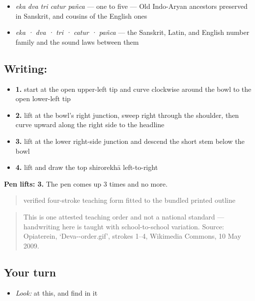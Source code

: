 \begin{itemize}
\raggedright
  \item \emph{eka dva tri catur pañca} — one to five — Old Indo-Aryan ancestors preserved in Sanskrit, and cousins of the English ones
  \item \emph{eka · dva · tri · catur · pañca} — the Sanskrit, Latin, and English number family and the sound laws between them
\end{itemize}

\subsection*{Writing: }

\begin{itemize}
\raggedright
  \item \textbf{1.} start at the open upper-left tip and curve clockwise around the bowl to the open lower-left tip
  \item \textbf{2.} lift at the bowl's right junction, sweep right through the shoulder, then curve upward along the right side to the headline
  \item \textbf{3.} lift at the lower right-side junction and descend the short stem below the bowl
  \item \textbf{4.} lift and draw the top shirorekhā left-to-right
\end{itemize}

\textbf{Pen lifts: 3.} The pen comes up 3 times and no more.

\begin{quote}
verified four-stroke teaching form fitted to the bundled printed outline
\end{quote}

\begin{quote}
This is one attested teaching order and not a national standard — handwriting here is taught with school-to-school variation. Source: Opiaterein, ‘Deva--order.gif’, strokes 1–4, Wikimedia Commons, 10 May 2009.
\end{quote}

\subsection*{Your turn}
\begin{itemize}
\raggedright
  \item \emph{Look:} at this, and find  in it
\end{itemize}

